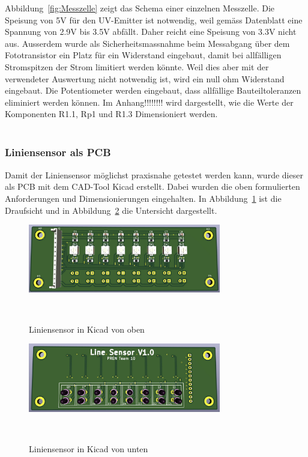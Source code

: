 \documentclass[main.tex]{subfiles} %
\begin{document}
Abbildung~\ref{fig:Messzelle} zeigt das Schema einer einzelnen Messzelle. Die Speisung von 5V für 
den UV-Emitter ist notwendig, weil gemäss Datenblatt eine Spannung von 2.9V bis 3.5V abfällt. Daher reicht
eine Speisung von 3.3V nicht aus. Ausserdem wurde als Sicherheitsmassnahme beim Messabgang über dem 
Fototransistor ein Platz für ein Widerstand eingebaut, damit bei allfälligen Stromspitzen der Strom 
limitiert werden könnte. Weil dies aber mit der verwendeter Auswertung nicht notwendig ist, wird ein
null ohm Widerstand eingebaut. Die Potentiometer werden eingebaut, dass allfällige Bauteiltoleranzen
eliminiert werden können. Im Anhang!!!!!!!! wird dargestellt, wie die Werte der Komponenten R1.1, Rp1 und R1.3 
Dimensioniert werden.\\\\






\subsubsection{Liniensensor als PCB}

Damit der Liniensensor möglichst praxisnahe getestet 
werden kann, wurde dieser als PCB mit dem CAD-Tool Kicad erstellt. Dabei wurden die 
oben formulierten Anforderungen und Dimensionierungen eingehalten. In Abbildung~\ref{fig:Liniensensor_Top} 
ist die Draufsicht und in Abbildung~\ref{fig:Liniensensor_Bottom} die Untersicht dargestellt.

\begin{figure}[H]
    \centering
    \includegraphics[width=0.75\textwidth]{fig_Strecke_Tracken/Liniensensor_Top.pdf}
    \caption{Liniensensor in Kicad von oben}~\label{fig:Liniensensor_Top}
\end{figure}

\begin{figure}[H]
    \centering
    \includegraphics[width=0.75\textwidth]{fig_Strecke_Tracken/Liniensensor_Bottom.pdf}
    \caption{Liniensensor in Kicad von unten}~\label{fig:Liniensensor_Bottom}
\end{figure}
\end{document}
